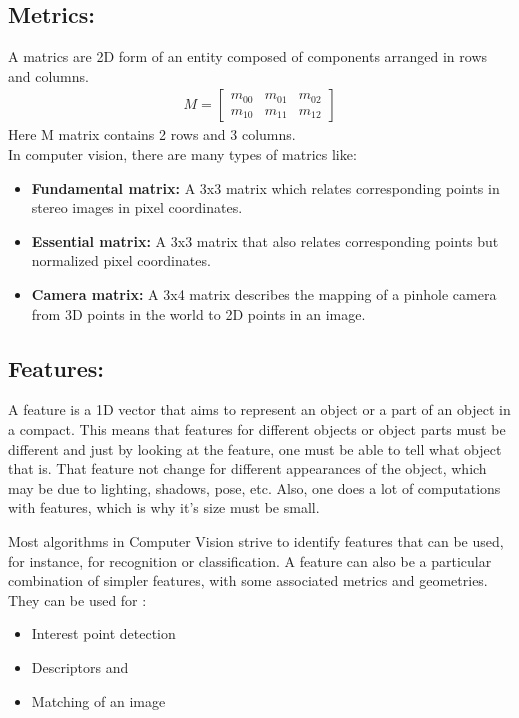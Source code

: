 \documentclass[12pt,a4paper] {article}
\begin{document}
	\subsection{Metrics:}
	A matrics are 2D form of an entity composed of components arranged in rows and columns. 
	\begin{gather}
		M = 
 		\begin{bmatrix} 
 			m_{00} & m_{01} & m_{02}\\ 
 			m_{10} & m_{11} & m_{12}
 		\end{bmatrix}
	\end{gather}
	Here M matrix contains 2 rows and 3 columns. \\
	In computer vision, there are many types of matrics like: 
	\begin{itemize}
	  \item \textbf{Fundamental matrix:} A 3x3 matrix which relates corresponding points in stereo images in pixel coordinates.
	  \item \textbf{Essential matrix:} A 3x3 matrix that also relates corresponding points but normalized pixel coordinates.
	  \item \textbf{Camera matrix:} A 3x4 matrix describes the mapping of a pinhole camera from 3D points in the world to 2D points in an image.
	\end{itemize}


	\subsection{Features:}
	A feature is a 1D vector that aims to represent an object or a part of an object in a compact.
	This means that features for different objects or object parts must be different and just by looking at the feature, 
	one must be able to tell what object that is. That feature not change for different appearances of the object, 
	which may be due to lighting, shadows, pose, etc. Also, one does a lot of computations with features, 
	which is why it's size must be small.

	Most algorithms in Computer Vision strive to identify features that can be used, for instance, for recognition or classification. 
	A feature can also be a particular combination of simpler features, with some associated metrics and geometries.
	They can be used for : 
	\begin{itemize}
		\item Interest point detection
		\item Descriptors and
		\item Matching of an image
	\end{itemize}
	
\end{document}
